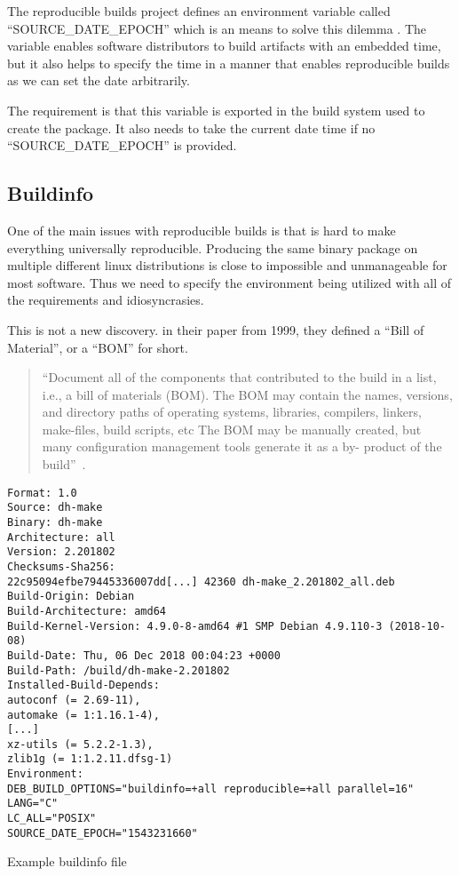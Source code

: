 \documentclass[../Main/thesis.tex]{subfiles}
\begin{document}
The reproducible builds project defines an environment variable called
``SOURCE\_DATE\_EPOCH'' which is an means to solve this dilemma
\cite{reproducible-builds-2019-source-date-epoch}. The variable enables software
distributors to build artifacts with an embedded time, but it also helps to
specify the time in a manner that enables reproducible builds as we can set the
date arbitrarily.

The requirement is that this variable is exported in the build system used to
create the package. It also needs to take the current date time if no
``SOURCE\_DATE\_EPOCH'' is provided.

\subsection*{Buildinfo}
One of the main issues with reproducible builds is that is hard to make
everything universally reproducible. Producing the same binary package on
multiple different linux distributions is close to impossible and unmanageable
for most software. Thus we need to specify the environment being utilized with
all of the requirements and idiosyncrasies.

This is not a new discovery. \citeauthor{software-reconstruction-1999} in their
paper  from 1999, they defined a ``Bill
of Material'', or a ``BOM'' for short.

\begin{quotation}
``Document all of the components that contributed to the build in a list, i.e.,
a bill of materials (BOM). The BOM may contain the names, versions, and
directory paths of operating systems, libraries, compilers, linkers, make-files,
build scripts, etc The BOM may be manually created, but many configuration
management tools generate it as a by- product of the build''~\cite{software-reconstruction-1999}.
\end{quotation}

\begin{listing}[H]
\begin{verbatim}
Format: 1.0
Source: dh-make
Binary: dh-make
Architecture: all
Version: 2.201802
Checksums-Sha256:
22c95094efbe79445336007dd[...] 42360 dh-make_2.201802_all.deb
Build-Origin: Debian
Build-Architecture: amd64
Build-Kernel-Version: 4.9.0-8-amd64 #1 SMP Debian 4.9.110-3 (2018-10-08)
Build-Date: Thu, 06 Dec 2018 00:04:23 +0000
Build-Path: /build/dh-make-2.201802
Installed-Build-Depends:
autoconf (= 2.69-11),
automake (= 1:1.16.1-4),
[...]
xz-utils (= 5.2.2-1.3),
zlib1g (= 1:1.2.11.dfsg-1)
Environment:
DEB_BUILD_OPTIONS="buildinfo=+all reproducible=+all parallel=16"
LANG="C"
LC_ALL="POSIX"
SOURCE_DATE_EPOCH="1543231660"
\end{verbatim}
\caption{Example buildinfo file}
\label{lst:buildinfo}
\end{listing}
\end{document}
